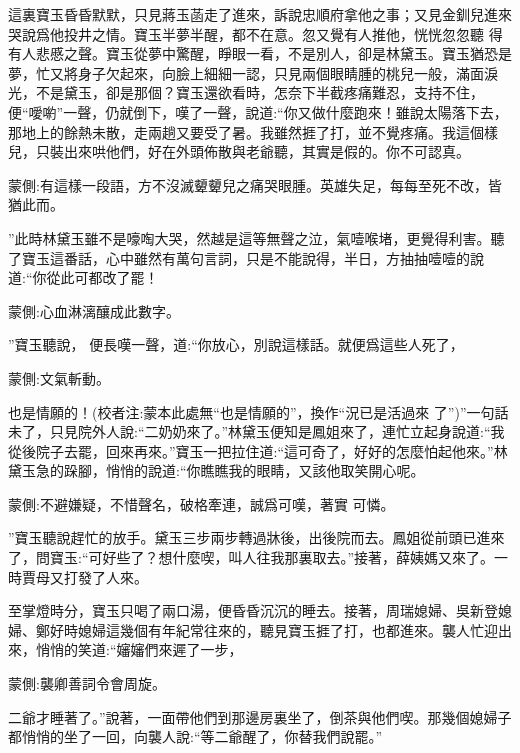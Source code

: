 \begin{parag}
    這裏寶玉昏昏默默，只見蔣玉菡走了進來，訴說忠順府拿他之事；又見金釧兒進來哭說爲他投井之情。寶玉半夢半醒，都不在意。忽又覺有人推他，恍恍忽忽聽 得有人悲慼之聲。寶玉從夢中驚醒，睜眼一看，不是別人，卻是林黛玉。寶玉猶恐是夢，忙又將身子欠起來，向臉上細細一認，只見兩個眼睛腫的桃兒一般，滿面淚光，不是黛玉，卻是那個？寶玉還欲看時，怎奈下半截疼痛難忍，支持不住，便“噯喲”一聲，仍就倒下，嘆了一聲，說道:“你又做什麼跑來！雖說太陽落下去， 那地上的餘熱未散，走兩趟又要受了暑。我雖然捱了打，並不覺疼痛。我這個樣兒，只裝出來哄他們，好在外頭佈散與老爺聽，其實是假的。你不可認真。\begin{note}蒙側:有這樣一段語，方不沒滅顰顰兒之痛哭眼腫。英雄失足，每每至死不改，皆猶此而。\end{note}”此時林黛玉雖不是嚎啕大哭，然越是這等無聲之泣，氣噎喉堵，更覺得利害。聽了寶玉這番話，心中雖然有萬句言詞，只是不能說得，半日，方抽抽噎噎的說道:“你從此可都改了罷！\begin{note}蒙側:心血淋漓釀成此數字。\end{note}”寶玉聽說， 便長嘆一聲，道:“你放心，別說這樣話。就便爲這些人死了，\begin{note}蒙側:文氣斬動。\end{note}也是情願的！(校者注:蒙本此處無“也是情願的”，換作“況已是活過來 了”)”一句話未了，只見院外人說:“二奶奶來了。”林黛玉便知是鳳姐來了，連忙立起身說道:“我從後院子去罷，回來再來。”寶玉一把拉住道:“這可奇了，好好的怎麼怕起他來。”林黛玉急的跺腳，悄悄的說道:“你瞧瞧我的眼睛，又該他取笑開心呢。\begin{note}蒙側:不避嫌疑，不惜聲名，破格牽連，誠爲可嘆，著實 可憐。\end{note}”寶玉聽說趕忙的放手。黛玉三步兩步轉過牀後，出後院而去。鳳姐從前頭已進來了，問寶玉:“可好些了？想什麼喫，叫人往我那裏取去。”接著，薛姨媽又來了。一時賈母又打發了人來。
\end{parag}


\begin{parag}
    至掌燈時分，寶玉只喝了兩口湯，便昏昏沉沉的睡去。接著，周瑞媳婦、吳新登媳婦、鄭好時媳婦這幾個有年紀常往來的，聽見寶玉捱了打，也都進來。襲人忙迎出來，悄悄的笑道:“嬸嬸們來遲了一步，\begin{note}蒙側:襲卿善詞令會周旋。\end{note}二爺才睡著了。”說著，一面帶他們到那邊房裏坐了，倒茶與他們喫。那幾個媳婦子都悄悄的坐了一回，向襲人說:“等二爺醒了，你替我們說罷。”
\end{parag}


